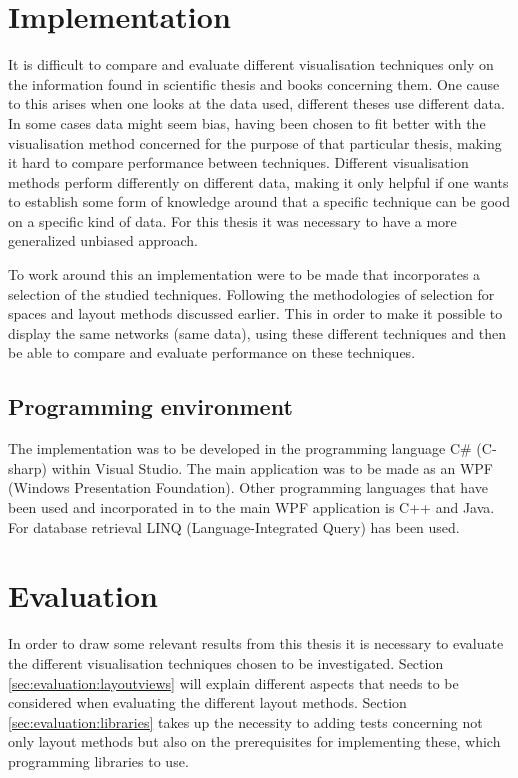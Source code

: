 \documentclass[a4paper,11pt]{kth-mag}
\begin{document}
\section{Implementation}
\label{sec:Implementation} 
It is difficult to compare and evaluate different visualisation techniques only on the information found in scientific thesis and books concerning them. 
One cause to this arises when one looks at the data used, different theses use different data. In some cases data might seem bias, having been chosen to fit better with the 
visualisation method concerned for the purpose of that particular thesis, making it hard to compare performance between techniques. Different visualisation methods perform differently on different data, making it 
only helpful if one wants to establish some form of knowledge around that a specific technique can be good on a specific kind of data. For this thesis it was necessary to have a more generalized unbiased approach.

To work around this an implementation were to be made that incorporates a selection of the studied techniques. Following the methodologies of selection for spaces and layout methods discussed earlier.
This in order to make it possible to display the same networks (same data), using these different techniques and then be able to compare and evaluate performance on these techniques.
\subsection{Programming environment}
The implementation was to be developed in the programming language C\# \space (C-sharp)\cite{website:MSDN} within Visual Studio\cite{website:VisualStudio}. 
The main application was to be made as an WPF (Windows Presentation Foundation)\cite{website:WPF}. Other programming languages that have been used and incorporated in to the main WPF application is C++\cite{website:C++} 
and Java\cite{website:Java}. For database retrieval LINQ (Language-Integrated Query)\cite{website:LINQ} has been used.
\section{Evaluation}
\label{sec:evaluation}
In order to draw some relevant results from this thesis it is necessary to evaluate the different visualisation techniques chosen to be investigated. Section \ref{sec:evaluation:layoutviews} will  
explain different aspects that needs to be considered when evaluating the different layout methods. Section \ref{sec:evaluation:libraries} takes up the necessity to adding tests concerning not
 only layout methods but also on the prerequisites for implementing these, which programming libraries to use.
\end{document}
